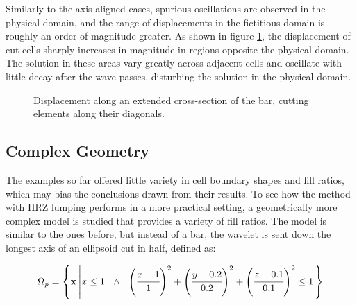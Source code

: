 Similarly to the axis-aligned cases, spurious oscillations are observed in the physical domain, and the range of displacements in the fictitious domain is roughly an order of magnitude greater. As shown in figure \ref{fig:rotated_bar_extended_cross_section}, the displacement of cut cells sharply increases in magnitude in regions opposite the physical domain. The solution in these areas vary greatly across adjacent cells and oscillate with little decay after the wave passes, disturbing the solution in the physical domain.

\begin{figure}[!h]
	\centering
	\begin{subfigure}{0.49\textwidth}
		\centering
	\end{subfigure}
	\hfill
	\begin{subfigure}{0.49\textwidth}
		\centering
	\end{subfigure}
	\caption{Displacement along an extended cross-section of the bar, cutting elements along their diagonals.}
	\label{fig:rotated_bar_extended_cross_section}
\end{figure}

%
\subsection{Complex Geometry}
\label{section:complex_geometry}
%

The examples so far offered little variety in cell boundary shapes and fill ratios, which may bias the conclusions drawn from their results. To see how the method with HRZ lumping performs in a more practical setting, a geometrically more complex model is studied that provides a variety of fill ratios. The model is similar to the ones before, but instead of a bar, the wavelet is sent down the longest axis of an ellipsoid cut in half, defined as:

\begin{equation} \label{eq:ellipsoid_definition}
	\Omega_p = \left\{
		\mathbf x \left|
			x \leq 1
			\ \ \land \ \
			\left( \cfrac{x-1}{1} \right)^2
			+ \left( \cfrac{y-0.2}{0.2} \right)^2
			+ \left( \cfrac{z-0.1}{0.1} \right)^2
			\leq 1
		\right.
	\right\}
\end{equation}

